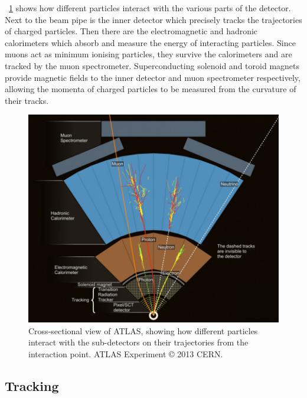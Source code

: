 \Figure~\ref{fig:atlas_wedge} shows how different particles interact with the various 
parts of the detector. Next to the beam pipe is the inner detector which precisely tracks 
the trajectories of charged particles. Then there are the electromagnetic and hadronic 
calorimeters which absorb and measure the energy of interacting particles. Since muons act
as minimum ionising particles, they survive the calorimeters and are tracked by the muon 
spectrometer. Superconducting solenoid and toroid magnets provide magnetic fields to the 
inner detector and muon spectrometer respectively, allowing the momenta of charged 
particles to be measured from the curvature of their tracks.

\begin{figure}
	\includegraphics[width=\largefigwidth]{tex/experiment/atlas_wedge}
	\caption{Cross-sectional view of ATLAS, showing how different particles interact with 
	the sub-detectors on their trajectories from the interaction point. ATLAS Experiment 
	\copyright\xspace 2013 CERN.}
	\label{fig:atlas_wedge}
\end{figure}



\subsection{Tracking}

